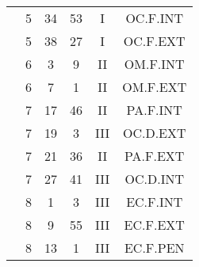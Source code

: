 \documentclass[12pt, a4paper]{article}
\begin{document}
\begin{multicols}{3}
{\begin{tabular}{c c c c c c}
	 	 	 	 & 5 & 34 & 53 & I & OC.F.INT\\%
	 	 	 	 & 5 & 38 & 27 & I & OC.F.EXT\\%
	 	 	 	 & 6 & 3 & 9 & II & OM.F.INT\\%
	 	 	 	 & 6 & 7 & 1 & II & OM.F.EXT\\%
	 	 	 	 & 7 & 17 & 46 & II & PA.F.INT\\%
	 	 	 	 & 7 & 19 & 3 & III & OC.D.EXT\\%
	 	 	 	 & 7 & 21 & 36 & II & PA.F.EXT\\%
	 	 	 	 & 7 & 27 & 41 & III & OC.D.INT\\%
	 	 	 	 & 8 & 1 & 3 & III & EC.F.INT\\%
	 	 	 	 & 8 & 9 & 55 & III & EC.F.EXT\\%
	 	 	 	 & 8 & 13 & 1 & III & EC.F.PEN\\%
	 	 \end{tabular}
 	}
\end{multicols}
\end{document}
